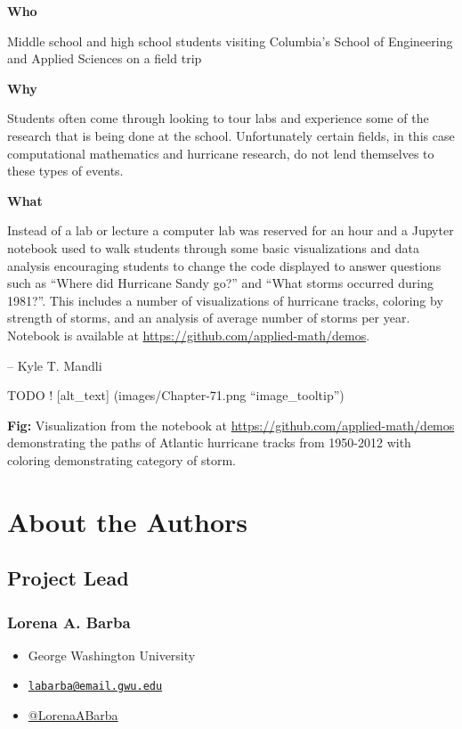 \documentclass[]{book}
\providecommand{\tightlist}{%
  \setlength{\itemsep}{0pt}\setlength{\parskip}{0pt}}
\begin{document}
\textbf{Who }

Middle school and high school students visiting Columbia's School of
Engineering and Applied Sciences on a field trip

\textbf{Why }

Students often come through looking to tour labs and experience some of
the research that is being done at the school. Unfortunately certain
fields, in this case computational mathematics and hurricane research,
do not lend themselves to these types of events.

\textbf{What }

Instead of a lab or lecture a computer lab was reserved for an hour and
a Jupyter notebook used to walk students through some basic
visualizations and data analysis encouraging students to change the code
displayed to answer questions such as ``Where did Hurricane Sandy go?''
and ``What storms occurred during 1981?''. This includes a number of
visualizations of hurricane tracks, coloring by strength of storms, and
an analysis of average number of storms per year. Notebook is available
at \url{https://github.com/applied-math/demos}.

-- Kyle T. Mandli

TODO ! {[}alt\_text{]} (images/Chapter-71.png ``image\_tooltip'')

\textbf{Fig: }Visualization from the notebook at
\url{https://github.com/applied-math/demos} demonstrating the paths of
Atlantic hurricane tracks from 1950-2012 with coloring demonstrating
category of storm.

\chapter{About the Authors}\label{authors}

\section{Project Lead}\label{project-lead}

\subsection{Lorena A. Barba}\label{lorena-a.-barba}

\begin{itemize}
\tightlist
\item
  George Washington University
\item
  \href{mailto:labarba@email.gwu.edu}{\nolinkurl{labarba@email.gwu.edu}}
\item
  \href{https://twitter.com/LorenaABarba}{@LorenaABarba}
\end{itemize}
\end{document}
